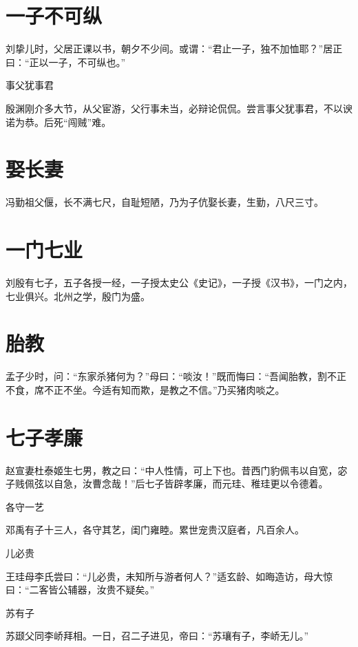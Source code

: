 \documentclass[a4paper,12pt,UTF8,twoside]{ctexbook}
\begin{document}
    \section{一子不可纵}
    
    刘挚儿时，父居正课以书，朝夕不少间。或谓：“君止一子，独不加恤耶？”居正曰：“正以一子，不可纵也。”
    
    事父犹事君
    
    殷渊刚介多大节，从父宦游，父行事未当，必辩论侃侃。尝言事父犹事君，不以谀诺为恭。后死“闯贼”难。
    
    \section{娶长妻}
    
    冯勤祖父偃，长不满七尺，自耻短陋，乃为子伉娶长妻，生勤，八尺三寸。
    
    \section{一门七业}
    
    刘殷有七子，五子各授一经，一子授太史公《史记》，一子授《汉书》，一门之内，七业俱兴。北州之学，殷门为盛。
    
    \section{胎教}
    
    孟子少时，问：“东家杀猪何为？”母曰：“啖汝！”既而悔曰：“吾闻胎教，割不正不食，席不正不坐。今适有知而欺，是教之不信。”乃买猪肉啖之。
    
    \section{七子孝廉}
    
    赵宣妻杜泰姬生七男，教之曰：“中人性情，可上下也。昔西门豹佩韦以自宽，宓子贱佩弦以自急，汝曹念哉！”后七子皆辟孝廉，而元珪、稚珪更以令德着。
    
    各守一艺
    
    邓禹有子十三人，各守其艺，闺门雍睦。累世宠贵汉庭者，凡百余人。
    
    儿必贵
    
    王珪母李氏尝曰：“儿必贵，未知所与游者何人？”适玄龄、如晦造访，母大惊曰：“二客皆公辅器，汝贵不疑矣。”
    
    苏有子
    
    苏颋父同李峤拜相。一日，召二子进见，帝曰：“苏瓖有子，李峤无儿。”
    
\end{document}
